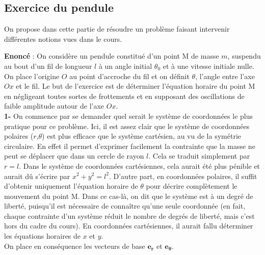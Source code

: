 \documentclass{article}
\begin{document}
\subsection{Exercice du pendule}

On propose dans cette partie de résoudre un problème faisant intervenir différentes notions vues dans le cours. 

\begin{center}
\end{center}

\textbf{Enoncé} : On considère un pendule constitué d'un point M de masse $m$, suspendu au bout d'un fil de longueur $l$ à un angle initial $\theta_0$ et à une vitesse initiale nulle. On place l'origine $O$ au point d'accroche du fil et on définit $\theta$, l'angle entre l'axe $Ox$ et le fil. Le but de l'exercice est de déterminer l'équation horaire du point M en négligeant toutes sortes de frottements et en supposant des oscillations de faible amplitude autour de l'axe $Ox$.\\

\textbf{1-} On commence par se demander quel serait le système de coordonnées le plus pratique pour ce problème. Ici, il est assez clair que le système de coordonnées polaires ($r$,$\theta$) est plus efficace que le système cartésien, au vu de la symétrie circulaire. En effet il permet d'exprimer facilement la contrainte que la masse ne peut se déplacer que dans un cercle de rayon $l$. Cela se traduit simplement par $r = l$. Dans le système de coordonnées cartésiennes, cela aurait été plus pénible et aurait dû s'écrire par $x^2 + y^2 = l^2$. D'autre part, en coordonnées polaires, il suffit d'obtenir uniquement l'équation horaire de $\theta$ pour décrire complètement le mouvement du point M. Dans ce cas-là, on dit que le système est à un degré de liberté, puisqu'il est nécessaire de connaître qu'une seule coordonnée (en fait, chaque contrainte d'un système réduit le nombre de degrés de liberté, mais c'est hors du cadre du cours). En coordonnées cartésiennes, il aurait fallu déterminer les équations horaires de $x$ et $y$.\\
On place en conséquence les vecteurs de base $\mathbf{e_r}$ et $\mathbf{e_\theta}$. \\
\end{document}
